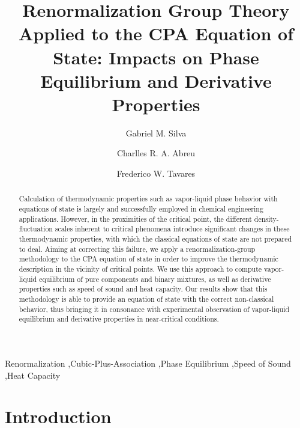 \documentclass[preprint,12pt,3p]{elsarticle}
\date{\vspace{-5ex}}
\begin{document}
\begin{frontmatter}

\title{Renormalization Group Theory Applied to the CPA Equation of State: Impacts on Phase Equilibrium and Derivative Properties}


\author[1]{Gabriel M. Silva}
\author[1]{Charlles R. A. Abreu}
\author[1,2]{Frederico W. Tavares}
\address[1]{Escola de Qu\'imica, Universidade Federal do Rio de Janeiro, Rio de Janeiro C.P. 68542, Brazil}
\address[2]{Programa de Engenharia Qu\'imica – COPPE, Universidade Federal do Rio de Janeiro, Rio de Janeiro, C.P. 68542, Brazil}

\begin{abstract}
Calculation of thermodynamic properties such as vapor-liquid phase behavior with equations of state is largely and successfully employed in chemical engineering applications.
However, in the proximities of the critical point, the different density-fluctuation scales inherent to critical phenomena introduce significant changes in these thermodynamic properties, with which the classical equations of state are not prepared to deal.
Aiming at correcting this failure, we apply a renormalization-group methodology to the CPA equation of state in order to improve the thermodynamic description in the vicinity of critical points.
We use this approach to compute vapor-liquid equilibrium of pure components and binary mixtures, as well as derivative properties such as speed of sound and heat capacity.
Our results show that this methodology is able to provide an equation of state with the correct non-classical behavior, thus bringing it in consonance with experimental observation of vapor-liquid equilibrium and derivative properties in near-critical conditions.
\end{abstract}

\begin{keyword}
Renormalization \sep Cubic-Plus-Association \sep Phase Equilibrium \sep Speed of Sound \sep Heat Capacity
\end{keyword}

\end{frontmatter}

\linenumbers

\renewcommand{\thesection}{\arabic{section}}
\section{Introduction}
\end{document}
